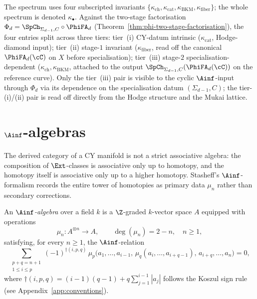 \begin{remark}
\label{rem:cyclic-ainf-kappa-convention}
The spectrum uses four subscripted invariants
$\{\kappa_{\mathrm{ch}}, \kappa_{\mathrm{cat}},
\kappa_{\mathrm{BKM}}, \kappa_{\mathrm{fiber}}\}$; the whole spectrum
is denoted $\kappa_\bullet$. Against the two-stage factorisation
$\Phi_d = \SpCh_{\Sigma_{d-1},C} \circ \PhiFA_d$
(Theorem~\ref{thm:phi-two-stage-factorisation}), the four entries split
across three tiers: tier~(i) CY-datum intrinsic
($\kappa_{\mathrm{cat}}$, Hodge-diamond input); tier~(ii) stage-$1$
invariant ($\kappa_{\mathrm{fiber}}$, read off the canonical
$\PhiFA_d(\cC)$ on $X$ before specialisation); tier~(iii)
stage-$2$ specialisation-dependent
($\kappa_{\mathrm{ch}}, \kappa_{\mathrm{BKM}}$, attached to the output
$\SpCh_{\Sigma_{d-1},C}(\PhiFA_d(\cC))$ on the reference curve). Only
the tier~(iii) pair is visible to the cyclic $\Ainf$-input through
$\Phi_d$ via its dependence on the specialisation datum
$(\Sigma_{d-1},C)$; the tier-(i)/(ii) pair is read off directly from
the Hodge structure and the Mukai lattice.
\end{remark}

\section{\texorpdfstring{$\Ainf$}{A-inf}-algebras}
\label{sec:ainf-algebras}

The derived category of a CY manifold is not a strict associative algebra: the composition of $\Ext$-classes is associative only up to homotopy, and the homotopy itself is associative only up to a higher homotopy. Stasheff's $\Ainf$-formalism records the entire tower of homotopies as primary data $\mu_n$ rather than secondary corrections.

\begin{definition}
\label{def:ainf-algebra}
An \emph{$\Ainf$-algebra} over a field $k$ is a $\Z$-graded $k$-vector space $A$ equipped with operations
\[
 \mu_n \colon A^{\otimes n} \longrightarrow A, \qquad \deg(\mu_n) = 2 - n, \quad n \geq 1,
\]
satisfying, for every $n \geq 1$, the $\Ainf$-relation
\[
 \sum_{\substack{p+q = n+1 \\ 1 \leq i \leq p}} (-1)^{\dagger(i,p,q)}\,
 \mu_p\bigl(a_1, \ldots, a_{i-1},\, \mu_q(a_i, \ldots, a_{i+q-1}),\, a_{i+q}, \ldots, a_n\bigr) = 0,
\]
where $\dagger(i,p,q) = (i-1)(q-1) + q \sum_{j=1}^{i-1}|a_j|$ follows the Koszul sign rule (see Appendix~\ref{app:conventions}).
\end{definition}


